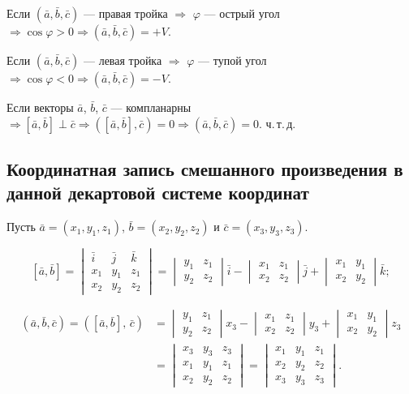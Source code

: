 \documentclass[12pt,a4paper]{article}
\newcommand{\va}{\bar{a}}
\newcommand{\vb}{\bar{b}}
\newcommand{\vc}{\bar{c}}
\newcommand{\vi}{\bar{i}}
\newcommand{\vj}{\bar{j}}
\newcommand{\vk}{\bar{k}}
\begin{document}
Если $(\va, \vb, \vc)$ --- правая тройка $\Rightarrow$ $\varphi$ ---
острый угол $\Rightarrow \cos\varphi > 0 \Rightarrow (\va, \vb, \vc) = +V$.

Если $(\va, \vb, \vc)$ --- левая тройка $\Rightarrow$ $\varphi$ ---
тупой угол $\Rightarrow \cos\varphi < 0 \Rightarrow (\va, \vb, \vc) = -V$.

Если векторы $\va$, $\vb$, $\vc$ --- компланарны $\Rightarrow
[\va,\vb] \perp \vc \Rightarrow ([\va,\vb], \vc) = 0 \Rightarrow
(\va, \vb, \vc) = 0$. \quad ч.\,т.\,д.

\subsection*{Координатная запись смешанного произведения в данной
декартовой системе координат}

Пусть $\va = (x_1, y_1, z_1)$, $\vb = (x_2, y_2, z_2)$ и $\vc = (x_3,
y_3, z_3)$.

$$
[\va, \vb] =
\begin{vmatrix} \vi & \vj & \vk \\ x_1 & y_1 & z_1 \\ x_2 & y_2 & z_2
\end{vmatrix}
=
\begin{vmatrix} y_1 & z_1 \\ y_2 & z_2
\end{vmatrix}\vi
-
\begin{vmatrix} x_1 & z_1 \\ x_2 & z_2
\end{vmatrix}\vj
+
\begin{vmatrix} x_1 & y_1 \\ x_2 & y_2
\end{vmatrix}\vk;
$$

\begin{align*}
  (\va, \vb, \vc) = ([\va,\vb],\, \vc)
  &=
  \begin{vmatrix} y_1 & z_1 \\ y_2 & z_2
  \end{vmatrix} x_3
  -
  \begin{vmatrix} x_1 & z_1 \\ x_2 & z_2
  \end{vmatrix} y_3
  +
  \begin{vmatrix} x_1 & y_1 \\ x_2 & y_2
  \end{vmatrix} z_3 \\
  &=
  \begin{vmatrix} x_3 & y_3 & z_3 \\ x_1 & y_1 & z_1 \\ x_2 & y_2 & z_2
  \end{vmatrix}
  =
  \begin{vmatrix} x_1 & y_1 & z_1 \\ x_2 & y_2 & z_2 \\ x_3 & y_3 & z_3
  \end{vmatrix}.
\end{align*}
\end{document}
